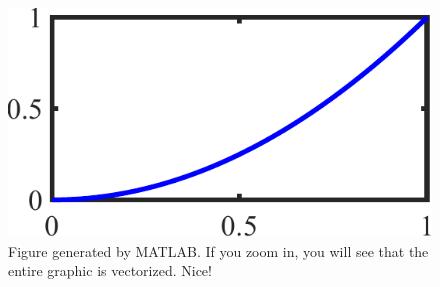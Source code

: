 \documentclass[12pt]{article}
\begin{document}
\begin{figure}
\centering\includegraphics[width=0.3\linewidth]{fig/test}\caption{Figure generated by MATLAB. If you zoom in, you will see that the entire graphic is vectorized. Nice!}
\end{figure}


\printbibliography[heading=bibintoc, title={References}]
\end{document}

